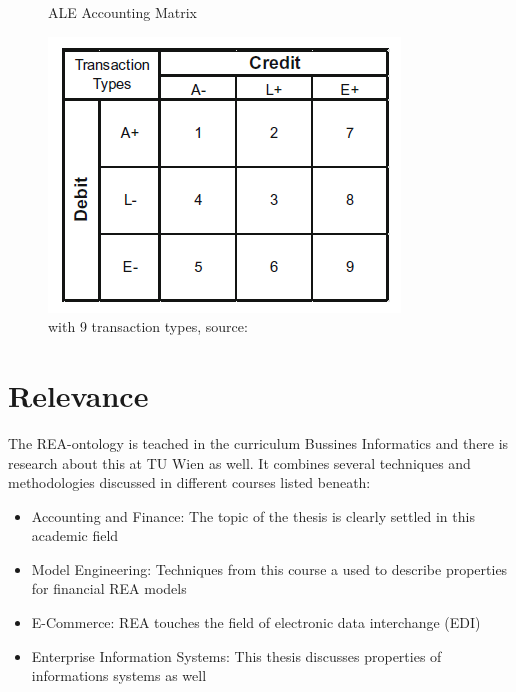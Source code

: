 


\begin{figure}
	\centering
	\caption{ALE Accounting Matrix}
	\label{fig:ale-accounting---schwaiger}
	\includegraphics[width=0.4\linewidth]{"../figures/ALE Accounting - Schwaiger"}
	\caption*{with 9 transaction types, source: \cite{schwaiger2015aleandrea}}
\end{figure}

%






\section{Relevance}

The REA-ontology is teached in the curriculum Bussines Informatics and there is research about this at TU Wien as well.
It combines several techniques and methodologies discussed in different courses listed beneath:

\begin{itemize}
	\item Accounting and Finance: The topic of the thesis is clearly settled in this academic field
	\item Model Engineering: Techniques from this course a used to describe properties for financial REA models
	\item E-Commerce: REA touches the field of electronic data interchange (EDI) 
	\item Enterprise Information Systems: This thesis discusses properties of informations systems as well
\end{itemize}

